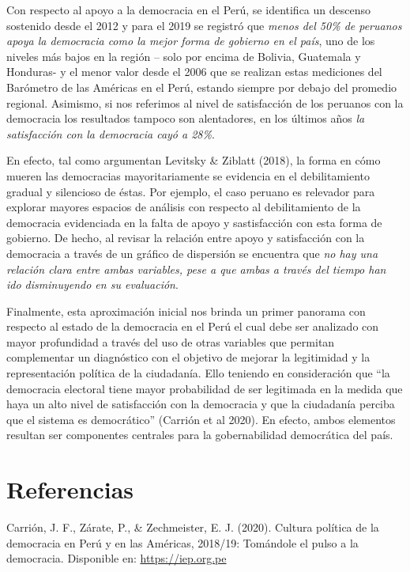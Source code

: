\documentclass[
]{book}
\begin{document}
Con respecto al apoyo a la democracia en el Perú, se identifica un descenso sostenido desde el 2012 y para el 2019 se registró que \emph{menos del 50\% de peruanos apoya la democracia como la mejor forma de gobierno en el país}, uno de los niveles más bajos en la región -- solo por encima de Bolivia, Guatemala y Honduras- y el menor valor desde el 2006 que se realizan estas mediciones del Barómetro de las Américas en el Perú, estando siempre por debajo del promedio regional. Asimismo, si nos referimos al nivel de satisfacción de los peruanos con la democracia los resultados tampoco son alentadores, en los últimos años \emph{la satisfacción con la democracia cayó a 28\%}.

En efecto, tal como argumentan Levitsky \& Ziblatt (2018), la forma en cómo mueren las democracias mayoritariamente se evidencia en el debilitamiento gradual y silencioso de éstas. Por ejemplo, el caso peruano es relevador para explorar mayores espacios de análisis con respecto al debilitamiento de la democracia evidenciada en la falta de apoyo y sastisfacción con esta forma de gobierno. De hecho, al revisar la relación entre apoyo y satisfacción con la democracia a través de un gráfico de dispersión se encuentra que \emph{no hay una relación clara entre ambas variables, pese a que ambas a través del tiempo han ido disminuyendo en su evaluación}.

Finalmente, esta aproximación inicial nos brinda un primer panorama con respecto al estado de la democracia en el Perú el cual debe ser analizado con mayor profundidad a través del uso de otras variables que permitan complementar un diagnóstico con el objetivo de mejorar la legitimidad y la representación política de la ciudadanía. Ello teniendo en consideración que ``la democracia electoral tiene mayor probabilidad de ser legitimada en la medida que haya un alto nivel de satisfacción con la democracia y que la ciudadanía perciba que el sistema es democrático'' (Carrión et al 2020). En efecto, ambos elementos resultan ser componentes centrales para la gobernabilidad democrática del país.

\hypertarget{referencias-1}{%
\section{Referencias}\label{referencias-1}}

Carrión, J. F., Zárate, P., \& Zechmeister, E. J. (2020). Cultura política de la democracia en Perú y en las Américas, 2018/19: Tomándole el pulso a la democracia. Disponible en: \url{https://iep.org.pe}
\end{document}
